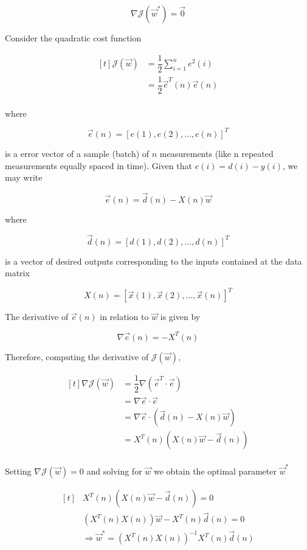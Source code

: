 \documentclass[twocolumn]{article}
\begin{document}
$$ \nabla \mathcal{J} ( \vec{w}^{*}) = \vec{0} $$

Consider the quadratic cost function

$$ \begin{aligned}[t]
	\mathcal{J} ( \vec{w}) &= \dfrac{1}{2} \sum_{i = 1}^{n} e^{2} (i) \\
			       &= \dfrac{1}{2} \vec{e}^{T} (n) \vec{e} (n) \\
\end{aligned}$$

\noindent where

$$ \vec{e} (n) = \left[ e(1), e(2), \ldots, e(n) \right]^{T} $$

\noindent is a error vector of a sample (batch) of $ n $ measurements (like n repeated measurements equally spaced in time). Given that $ e (i) = d (i) - y (i) $, we may write

$$ \vec{e} (n) = \vec{d} (n) - X (n) \vec{w} $$

\noindent where

$$ \vec{d} (n) = \left[ d (1), d (2), \ldots, d (n) \right]^{T} $$

\noindent is a vector of desired outputs corresponding to the inputs contained at the data matrix

$$ X (n) = \left[ \vec{x} (1), \vec{x} (2), \ldots, \vec{x} (n) \right]^{T} $$

The derivative of $ \vec{e} (n) $ in relation to $ \vec{w}$ is given by

$$ \nabla \vec{e} (n) = - X^{T} (n) $$

Therefore, computing the derivative of $ \mathcal{J} ( \vec{w}) $,

$$ \begin{aligned}[t]
	\nabla \mathcal{J} ( \vec{w}) &= \dfrac{1}{2} \nabla ( \vec{e}^{T} \cdot \vec{e}) \\
				      &= \nabla \vec{e} \cdot \vec{e} \\
				      &= \nabla \vec{e} \cdot ( \vec{d} (n) - X (n) \vec{w})\\
				      &= X^{T} (n)( X (n) \vec{w} - \vec{d} (n))\\
\end{aligned} $$

Setting $ \nabla \mathcal{J} ( \vec{w}) = 0 $ and solving for $ \vec{w} $ we obtain the optimal parameter $ \vec{w}^{*} $

$$ \begin{aligned}[t]
	& X^{T}(n) (X (n) \vec{w} - \vec{d} (n)) = 0 \\
	& (X^{T} (n) X (n)) \vec{w} - X^{T} (n) \vec{d} (n) = 0 \\
	& \Rightarrow \vec{w}^{*} = (X^{T} (n) X (n))^{-1} X^{T} (n) \vec{d} (n)\\
\end{aligned} $$
\end{document}
